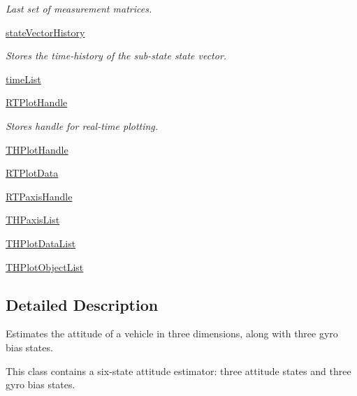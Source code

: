 \begin{DoxyCompactItemize}
\begin{DoxyCompactList}\small\item\em Last set of measurement matrices. \end{DoxyCompactList}\item 
\hyperlink{classmodest_1_1substates_1_1substate_1_1SubState_a38c12c9d0899bc1161f3502b584517a2}{state\+Vector\+History}
\begin{DoxyCompactList}\small\item\em Stores the time-\/history of the sub-\/state state vector. \end{DoxyCompactList}\item 
\hyperlink{classmodest_1_1substates_1_1substate_1_1SubState_a9b7a77e3b7dc14fc85962cda84e8cd58}{time\+List}
\item 
\hyperlink{classmodest_1_1substates_1_1substate_1_1SubState_a37ded775b84cea85b4dce0f1b16286c4}{R\+T\+Plot\+Handle}
\begin{DoxyCompactList}\small\item\em Stores handle for real-\/time plotting. \end{DoxyCompactList}\item 
\hyperlink{classmodest_1_1substates_1_1substate_1_1SubState_af1d5d3bbdf73cf1e78925c835f1c616e}{T\+H\+Plot\+Handle}
\item 
\hyperlink{classmodest_1_1substates_1_1substate_1_1SubState_a9fefae1facc797a1132fb61a55e9ffa1}{R\+T\+Plot\+Data}
\item 
\hyperlink{classmodest_1_1substates_1_1substate_1_1SubState_a497ccbb6658589b02568e87c6382222e}{R\+T\+Paxis\+Handle}
\item 
\hyperlink{classmodest_1_1substates_1_1substate_1_1SubState_a22c12497c37f47d54d4ea909f6423222}{T\+H\+Paxis\+List}
\item 
\hyperlink{classmodest_1_1substates_1_1substate_1_1SubState_a0e1d545f7ede186d89db38ca613633cf}{T\+H\+Plot\+Data\+List}
\item 
\hyperlink{classmodest_1_1substates_1_1substate_1_1SubState_a9659535520a27090d79be1957ecce2eb}{T\+H\+Plot\+Object\+List}
\end{DoxyCompactItemize}


\subsection{Detailed Description}
Estimates the attitude of a vehicle in three dimensions, along with three gyro bias states. 

This class contains a six-\/state attitude estimator\+: three attitude states and three gyro bias states.

